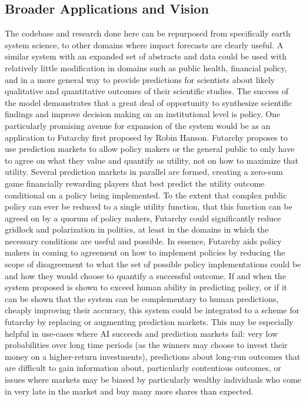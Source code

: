 \documentclass[12pt,a4paper]{article}
\begin{document}
\subsection{Broader Applications and Vision}
The codebase and research done here can be repurposed from specifically earth system science, to other domains where impact forecasts are clearly useful. A similar system with an expanded set of abstracts and data could be used with relatively little modification in domains such as public health, financial policy, and in a more general way to provide predictions for scientists about likely qualitative and quantitative outcomes of their scientific studies. The success of the model demonstrates that a great deal of opportunity to synthesize scientific findings and improve decision making on an institutional level is policy.
One particularly promising avenue for expansion of the system would be as an application to Futarchy first proposed by Robin Hanson. Futarchy proposes to use prediction markets to allow policy makers or the general public to only have to agree on what they value and quantify as utility, not on how to maximize that utility. Several prediction markets in parallel are formed, creating a zero-sum game financially rewarding players that best predict the utility outcome conditional on a policy being implemented. To the extent that complex public policy can ever be reduced to a single utility function, that this function can be agreed on by a quorum of policy makers, Futarchy could significantly reduce gridlock and polarization in politics, at least in the domains in which the necessary conditions are useful and possible. In essence, Futarchy aids policy makers in coming to agreement on how to implement policies by reducing the scope of disagreement to what the set of possible policy implementations could be and how they would choose to quantify a successful outcome.
If and when the system proposed is shown to exceed human ability in predicting policy, or if it can be shown that the system can be complementary to human predictions, cheaply improving their accuracy, this system could be integrated to a scheme for futarchy by replacing or augmenting prediction markets. This may be especially helpful in use-cases where AI succeeds and prediction markets fail: very low probabilities over long time periods (as the winners may choose to invest their money on a higher-return investments), predictions about long-run outcomes that are difficult to gain information about, particularly contentious outcomes, or issues where markets may be biased by particularly wealthy individuals who come in very late in the market and buy many more shares than expected.
\end{document}
